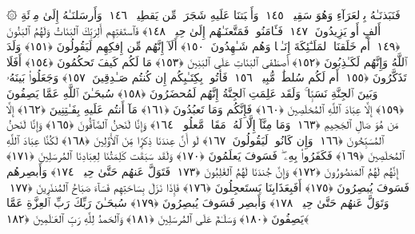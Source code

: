  ۞ فَنَبَذنَـٰهُ بِٱلعَرَآءِ وَهُوَ سَقِيمٌۭ ﴿١٤٥﴾
 وَأَنۢبَتنَا عَلَيهِ شَجَرَةًۭ مِّن يَقطِينٍۢ ﴿١٤٦﴾
 وَأَرسَلنَـٰهُ إِلَىٰ مِا۟ئَةِ أَلفٍ أَو يَزِيدُونَ ﴿١٤٧﴾
 فَـَٔامَنُوا۟ فَمَتَّعنَـٰهُم إِلَىٰ حِينٍۢ ﴿١٤٨﴾
 فَٱستَفتِهِم أَلِرَبِّكَ ٱلبَنَاتُ وَلَهُمُ ٱلبَنُونَ ﴿١٤٩﴾
 أَم خَلَقنَا ٱلمَلَـٰٓئِكَةَ إِنَـٰثًۭا وَهُم شَـٰهِدُونَ ﴿١٥٠﴾
 أَلَآ إِنَّهُم مِّن إِفكِهِم لَيَقُولُونَ ﴿١٥١﴾
 وَلَدَ ٱللَّهُ وَإِنَّهُم لَكَـٰذِبُونَ ﴿١٥٢﴾
 أَصطَفَى ٱلبَنَاتِ عَلَى ٱلبَنِينَ ﴿١٥٣﴾
 مَا لَكُم كَيفَ تَحكُمُونَ ﴿١٥٤﴾
 أَفَلَا تَذَكَّرُونَ ﴿١٥٥﴾
 أَم لَكُم سُلطَٰنٌۭ مُّبِينٌۭ ﴿١٥٦﴾
 فَأتُوا۟ بِكِتَـٰبِكُم إِن كُنتُم صَـٰدِقِينَ ﴿١٥٧﴾
 وَجَعَلُوا۟ بَينَهُۥ وَبَينَ ٱلجِنَّةِ نَسَبًۭا ۚ وَلَقَد عَلِمَتِ ٱلجِنَّةُ إِنَّهُم لَمُحضَرُونَ ﴿١٥٨﴾
 سُبحَـٰنَ ٱللَّهِ عَمَّا يَصِفُونَ ﴿١٥٩﴾
 إِلَّا عِبَادَ ٱللَّهِ ٱلمُخلَصِينَ ﴿١٦٠﴾
 فَإِنَّكُم وَمَا تَعبُدُونَ ﴿١٦١﴾
 مَآ أَنتُم عَلَيهِ بِفَـٰتِنِينَ ﴿١٦٢﴾
 إِلَّا مَن هُوَ صَالِ ٱلجَحِيمِ ﴿١٦٣﴾
 وَمَا مِنَّآ إِلَّا لَهُۥ مَقَامٌۭ مَّعلُومٌۭ ﴿١٦٤﴾
 وَإِنَّا لَنَحنُ ٱلصَّآفُّونَ ﴿١٦٥﴾
 وَإِنَّا لَنَحنُ ٱلمُسَبِّحُونَ ﴿١٦٦﴾
 وَإِن كَانُوا۟ لَيَقُولُونَ ﴿١٦٧﴾
 لَو أَنَّ عِندَنَا ذِكرًۭا مِّنَ ٱلأَوَّلِينَ ﴿١٦٨﴾
 لَكُنَّا عِبَادَ ٱللَّهِ ٱلمُخلَصِينَ ﴿١٦٩﴾
 فَكَفَرُوا۟ بِهِۦ ۖ فَسَوفَ يَعلَمُونَ ﴿١٧٠﴾
 وَلَقَد سَبَقَت كَلِمَتُنَا لِعِبَادِنَا ٱلمُرسَلِينَ ﴿١٧١﴾
 إِنَّهُم لَهُمُ ٱلمَنصُورُونَ ﴿١٧٢﴾
 وَإِنَّ جُندَنَا لَهُمُ ٱلغَٰلِبُونَ ﴿١٧٣﴾
 فَتَوَلَّ عَنهُم حَتَّىٰ حِينٍۢ ﴿١٧٤﴾
 وَأَبصِرهُم فَسَوفَ يُبصِرُونَ ﴿١٧٥﴾
 أَفَبِعَذَابِنَا يَستَعجِلُونَ ﴿١٧٦﴾
 فَإِذَا نَزَلَ بِسَاحَتِهِم فَسَآءَ صَبَاحُ ٱلمُنذَرِينَ ﴿١٧٧﴾
 وَتَوَلَّ عَنهُم حَتَّىٰ حِينٍۢ ﴿١٧٨﴾
 وَأَبصِر فَسَوفَ يُبصِرُونَ ﴿١٧٩﴾
 سُبحَـٰنَ رَبِّكَ رَبِّ ٱلعِزَّةِ عَمَّا يَصِفُونَ ﴿١٨٠﴾
 وَسَلَـٰمٌ عَلَى ٱلمُرسَلِينَ ﴿١٨١﴾
 وَٱلحَمدُ لِلَّهِ رَبِّ ٱلعَـٰلَمِينَ ﴿١٨٢﴾
 
